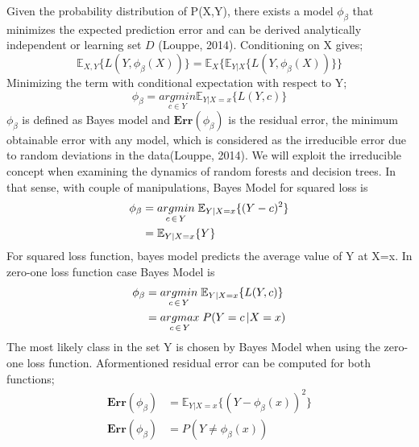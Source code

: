 Given the probability distribution of P(X,Y), there exists a model $\phi_{\beta}$ that minimizes the expected prediction error and can be derived analytically independent or learning set $D$ (Louppe, 2014). Conditioning on X gives;
\begin{equation}
\mathbb{E}_{X,Y} \{L(Y, \phi_{\beta}(X))\} = \mathbb{E}_{X}\{\mathbb{E}_{Y|X}\{L(Y, \phi_{\beta}(X)) \} \}
\end{equation}
Minimizing the term with conditional expectation with respect to Y;
\begin{equation}
\phi_{\beta} = \underset{c \in Y}{argmin} \mathbb{E}_{Y|X=x}\{L(Y,c)\}
\end{equation}
$\phi_{\beta}$ is defined as Bayes model and $\boldsymbol{Err}(\phi_{\beta})$ is the residual error, the minimum obtainable error with any model, which is considered as the irreducible error due to random deviations in the data(Louppe, 2014). We will exploit the irreducible concept when examining the dynamics of random forests and decision trees. In that sense, with couple of manipulations, Bayes Model for squared loss is
\begin{align}
\phi_{\beta} & = \underset{c \,\in\, Y}{argmin} \; \mathbb{E}_{Y|X=x}\{(Y-c)^2 \} \notag\\
			 & = \mathbb{E}_{Y|X=x}\{Y\}
\end{align}
For squared loss function, bayes model predicts the average value of Y at X=x. In zero-one loss function case Bayes Model is
\begin{align}
\phi_{\beta} & = \underset{c \,\in\, Y}{argmin} \; \mathbb{E}_{Y|X=x}\{L(Y,c) \} \notag\\
			 & = \underset{c \,\in\, Y}{argmax} \; P(Y = c \,| X = x)
\end{align}
The most likely class in the set Y is chosen by Bayes Model when using the zero-one loss function. Aformentioned residual error can be computed for both functions;
\begin{align}
\boldsymbol{Err}(\phi_{\beta}) & = \mathbb{E}_{Y|X=x}\{(Y-\phi_{\beta}(x))^2 \}\\
\boldsymbol{Err}(\phi_{\beta}) & = P(Y \neq \phi_{\beta}(x) )
\end{align}


